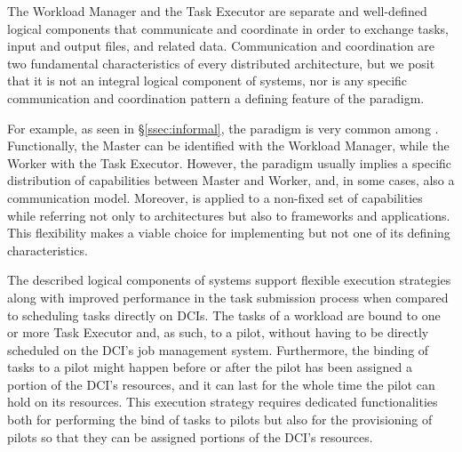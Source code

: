 \documentclass{sig-alternate}
\begin{document}
The Workload Manager and the Task Executor are separate and well-defined
logical components that communicate and coordinate in order to exchange tasks,
input and output files, and related data. Communication and coordination are
two fundamental characteristics of every distributed architecture, but we posit
that it is not an integral logical component of \pilotjob systems, nor is any
specific communication and coordination pattern a defining feature of the
\pilotjob paradigm.

For example, as seen in \S\ref{ssec:informal}, the \MW paradigm is very common
among \pilotjobs. Functionally, the Master can be identified with the Workload
Manager, while the Worker with the Task Executor. However, the \MW paradigm
usually implies a specific distribution of capabilities between Master and
Worker, and, in some cases, also a communication model. Moreover, \MW is
applied to a non-fixed set of capabilities while referring not only to
architectures but also to frameworks and applications. This flexibility makes
\MW a viable choice for implementing \pilotjobs but not one of its defining
characteristics.

The described logical components of \pilotjob systems support flexible
execution strategies along with improved performance in the task submission
process when compared to scheduling tasks directly on DCIs.  The tasks of a
workload are bound to one or more Task Executor and, as such, to a pilot, without
having to be directly scheduled on the DCI's job management system.
Furthermore, the binding of tasks to a pilot  might
happen before or after the pilot has been assigned a portion of the DCI's
resources, and it can last for the whole time the pilot can hold on its
resources. This execution strategy requires dedicated functionalities both for
performing the bind of tasks to pilots but also for the provisioning of pilots
so that they can be assigned portions of the DCI's resources.
\end{document}
